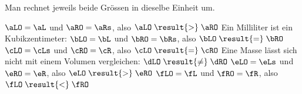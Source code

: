 Man rechnet jeweils beide Grössen in dieselbe Einheit um.
\begin{abcliste}
\abc $\aLO = \aL$ und $\aRO = \aRs$, also $\aLO \;\result{>}\; \aRO$
\abc Ein Milliliter ist ein Kubikzentimeter: $\bLO = \bL$ und $\bRO = \bRs$, also $\bLO \;\result{=}\; \bRO$
\abc $\cLO = \cLs$ und $\cRO = \cR$, also $\cLO \;\result{=}\; \cRO$
\abc Eine Masse lässt sich nicht mit einem Volumen vergleichen: $\dLO \;\result{\neq}\; \dRO$
\abc $\eLO = \eLs$ und $\eRO = \eR$, also $\eLO \;\result{>}\; \eRO$
\abc $\fLO = \fL$ und $\fRO = \fR$, also $\fLO \;\result{<}\; \fRO$
\end{abcliste}
